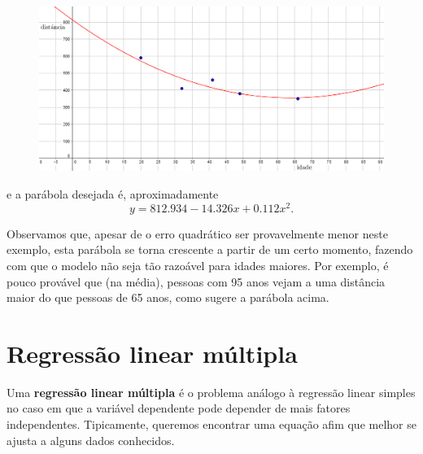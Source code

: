 \begin{ex}
\begin{figure}[h!]
\begin{center}
  		\includegraphics[width=1\linewidth]{Semana13/semana13-idade-parabola}
  	\end{center}
  \end{figure}
  e a parábola desejada é, aproximadamente
  \begin{equation}
  y = 812.934 - 14.326 x + 0.112 x^2.
  \end{equation}
  

  \noindent Observamos que, apesar de o erro quadrático ser provavelmente menor neste exemplo, esta parábola se torna crescente a partir de um certo momento, fazendo com que o modelo não seja tão razoável para idades maiores. Por exemplo, é pouco provável que (na média), pessoas com 95 anos vejam a uma distância maior do que pessoas de 65 anos, como sugere a parábola acima.
\end{ex}



\section{Regressão linear múltipla}

Uma \textbf{regressão linear múltipla} é o problema análogo à regressão linear simples no caso em que a variável dependente pode depender de mais fatores independentes. Tipicamente, queremos encontrar uma equação afim que melhor se ajusta a alguns dados conhecidos.

